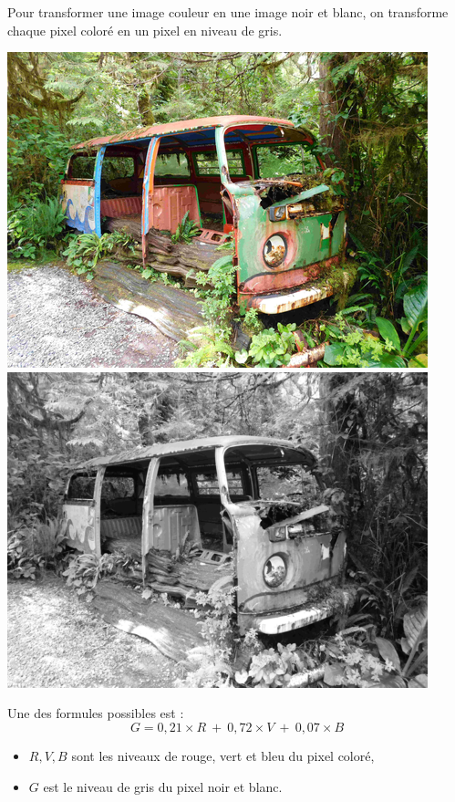 \documentclass[class=report,crop=false, 12pt]{standalone}
\begin{document}
\begin{enigme}[Couleurs]


Pour transformer une image couleur en une image \og{}noir et blanc\fg{}, on transforme chaque pixel coloré en un pixel en niveau de gris.

\begin{center}
  \includegraphics[scale=0.4]{photo_eg_couleurs-color.png}\qquad
  \includegraphics[scale=0.4]{photo_eg_couleurs-grayscale.png}   
\end{center}

Une des formules possibles est :
$$G = 0,21 \times R \  + \  0,72 \times V \  + \  0,07 \times B$$

\begin{itemize}
  \item $R,V,B$ sont les niveaux de rouge, vert et bleu du pixel coloré,
  \item $G$ est le niveau de gris du pixel \og{}noir et blanc\fg{}.
\end{itemize}


\end{enigme}
\end{document}
